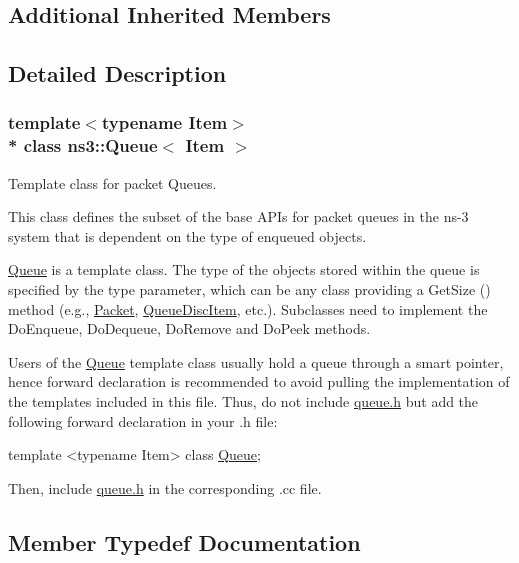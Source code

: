 \subsection*{Additional Inherited Members}


\subsection{Detailed Description}
\subsubsection*{template$<$typename Item$>$\\*
class ns3\+::\+Queue$<$ Item $>$}

Template class for packet Queues. 

This class defines the subset of the base A\+P\+Is for packet queues in the ns-\/3 system that is dependent on the type of enqueued objects.

\hyperlink{classns3_1_1Queue}{Queue} is a template class. The type of the objects stored within the queue is specified by the type parameter, which can be any class providing a Get\+Size () method (e.\+g., \hyperlink{classns3_1_1Packet}{Packet}, \hyperlink{classns3_1_1QueueDiscItem}{Queue\+Disc\+Item}, etc.). Subclasses need to implement the Do\+Enqueue, Do\+Dequeue, Do\+Remove and Do\+Peek methods.

Users of the \hyperlink{classns3_1_1Queue}{Queue} template class usually hold a queue through a smart pointer, hence forward declaration is recommended to avoid pulling the implementation of the templates included in this file. Thus, do not include \hyperlink{queue_8h}{queue.\+h} but add the following forward declaration in your .h file\+:


\begin{DoxyCode}
\textcolor{keyword}{template} <\textcolor{keyword}{typename} Item> \textcolor{keyword}{class }\hyperlink{classns3_1_1Queue_ab93c96716f7a89d4afdfa5751e542ffa}{Queue};
\end{DoxyCode}


Then, include \hyperlink{queue_8h}{queue.\+h} in the corresponding .cc file. 

\subsection{Member Typedef Documentation}
